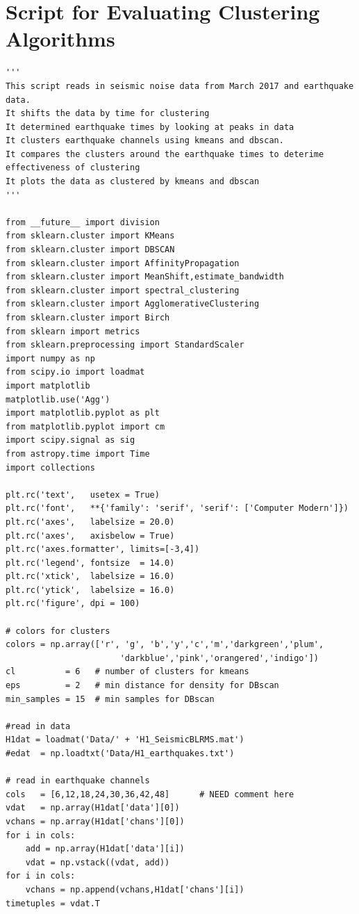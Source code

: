 \documentclass[colorlinks=true,pdfstartview=FitV,linkcolor=blue,
            citecolor=red,urlcolor=magenta]{ligodoc}
\begin{document}
\appendix
\section{Script for Evaluating Clustering Algorithms}
\begin{verbatim}
'''
This script reads in seismic noise data from March 2017 and earthquake data.
It shifts the data by time for clustering
It determined earthquake times by looking at peaks in data
It clusters earthquake channels using kmeans and dbscan.
It compares the clusters around the earthquake times to deterime effectiveness of clustering
It plots the data as clustered by kmeans and dbscan
'''

from __future__ import division
from sklearn.cluster import KMeans
from sklearn.cluster import DBSCAN
from sklearn.cluster import AffinityPropagation
from sklearn.cluster import MeanShift,estimate_bandwidth
from sklearn.cluster import spectral_clustering
from sklearn.cluster import AgglomerativeClustering
from sklearn.cluster import Birch
from sklearn import metrics
from sklearn.preprocessing import StandardScaler
import numpy as np
from scipy.io import loadmat
import matplotlib
matplotlib.use('Agg')
import matplotlib.pyplot as plt
from matplotlib.pyplot import cm
import scipy.signal as sig
from astropy.time import Time
import collections

plt.rc('text',   usetex = True)
plt.rc('font',   **{'family': 'serif', 'serif': ['Computer Modern']})
plt.rc('axes',   labelsize = 20.0)
plt.rc('axes',   axisbelow = True)
plt.rc('axes.formatter', limits=[-3,4])
plt.rc('legend', fontsize  = 14.0)
plt.rc('xtick',  labelsize = 16.0)
plt.rc('ytick',  labelsize = 16.0)
plt.rc('figure', dpi = 100)

# colors for clusters
colors = np.array(['r', 'g', 'b','y','c','m','darkgreen','plum',
                       'darkblue','pink','orangered','indigo'])
cl          = 6   # number of clusters for kmeans
eps         = 2   # min distance for density for DBscan
min_samples = 15  # min samples for DBscan

#read in data
H1dat = loadmat('Data/' + 'H1_SeismicBLRMS.mat')
#edat  = np.loadtxt('Data/H1_earthquakes.txt')

# read in earthquake channels
cols   = [6,12,18,24,30,36,42,48]      # NEED comment here
vdat   = np.array(H1dat['data'][0])
vchans = np.array(H1dat['chans'][0])
for i in cols:
    add = np.array(H1dat['data'][i])
    vdat = np.vstack((vdat, add))
for i in cols:
    vchans = np.append(vchans,H1dat['chans'][i])
timetuples = vdat.T


\end{verbatim}
\end{document}
